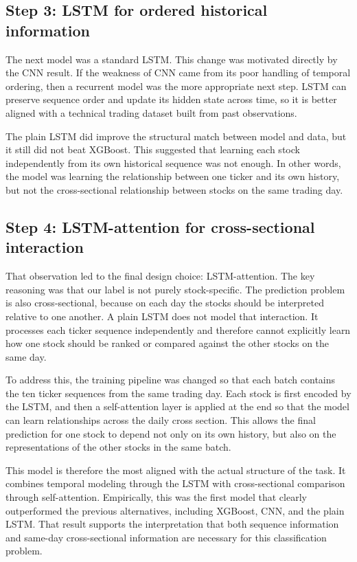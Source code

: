 \subsection{Step 3: LSTM for ordered historical information}

The next model was a standard LSTM. This change was motivated directly by the CNN result. If the weakness of CNN came from its poor handling of temporal ordering, then a recurrent model was the more appropriate next step. LSTM can preserve sequence order and update its hidden state across time, so it is better aligned with a technical trading dataset built from past observations.

The plain LSTM did improve the structural match between model and data, but it still did not beat XGBoost. This suggested that learning each stock independently from its own historical sequence was not enough. In other words, the model was learning the relationship between one ticker and its own history, but not the cross-sectional relationship between stocks on the same trading day.

\subsection{Step 4: LSTM-attention for cross-sectional interaction}

That observation led to the final design choice: LSTM-attention. The key reasoning was that our label is not purely stock-specific. The prediction problem is also cross-sectional, because on each day the stocks should be interpreted relative to one another. A plain LSTM does not model that interaction. It processes each ticker sequence independently and therefore cannot explicitly learn how one stock should be ranked or compared against the other stocks on the same day.

To address this, the training pipeline was changed so that each batch contains the ten ticker sequences from the same trading day. Each stock is first encoded by the LSTM, and then a self-attention layer is applied at the end so that the model can learn relationships across the daily cross section. This allows the final prediction for one stock to depend not only on its own history, but also on the representations of the other stocks in the same batch.

This model is therefore the most aligned with the actual structure of the task. It combines temporal modeling through the LSTM with cross-sectional comparison through self-attention. Empirically, this was the first model that clearly outperformed the previous alternatives, including XGBoost, CNN, and the plain LSTM. That result supports the interpretation that both sequence information and same-day cross-sectional information are necessary for this classification problem.

